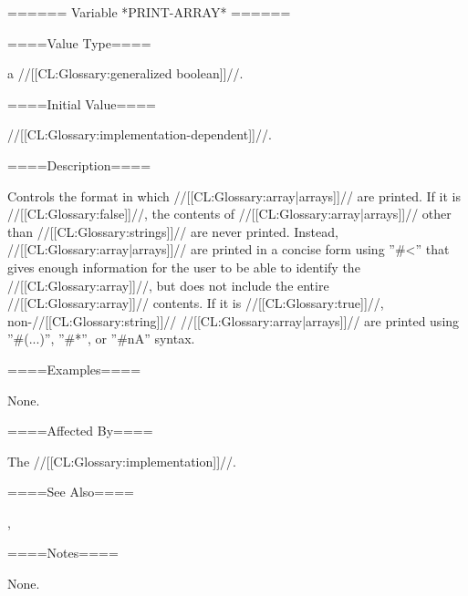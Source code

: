 ====== Variable *PRINT-ARRAY* ======

====Value Type====

a //[[CL:Glossary:generalized boolean]]//.

====Initial Value====

//[[CL:Glossary:implementation-dependent]]//.

====Description====

Controls the format in which //[[CL:Glossary:array|arrays]]// are printed. If it is //[[CL:Glossary:false]]//, the contents of //[[CL:Glossary:array|arrays]]// other than //[[CL:Glossary:strings]]// are never printed. Instead, //[[CL:Glossary:array|arrays]]// are printed in a concise form using ''#<'' that gives enough information for the user to be able to identify the //[[CL:Glossary:array]]//, but does not include the entire //[[CL:Glossary:array]]// contents. If it is //[[CL:Glossary:true]]//, non-//[[CL:Glossary:string]]// //[[CL:Glossary:array|arrays]]// are printed using ''#(...)'', ''#*'', or ''#nA'' syntax.

====Examples====

None.

====Affected By====

The //[[CL:Glossary:implementation]]//.

====See Also====

{\secref\SharpsignLeftParen}, {\secref\SharpsignLeftAngle}

====Notes====

None.

